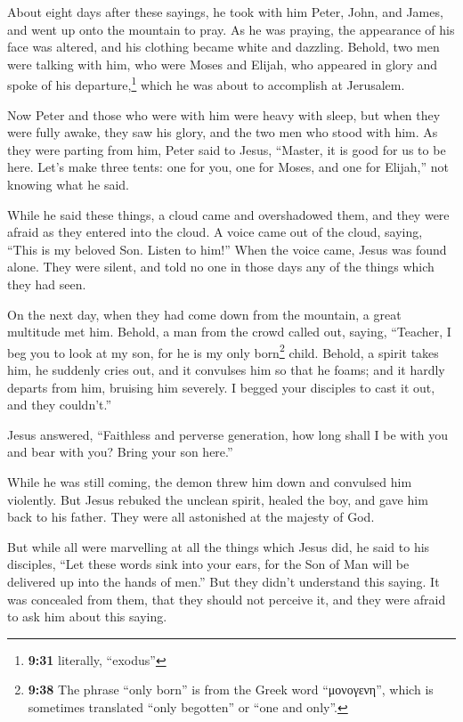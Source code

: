  About eight days after these sayings, he took with him
Peter, John, and James, and went up onto the mountain to pray.
 As he was praying, the appearance of his face was
altered, and his clothing became white and dazzling. 
Behold, two men were talking with him, who were Moses and Elijah,
 who appeared in glory and spoke of his
departure,\footnote{\textbf{9:31} literally, ``exodus''} which he was
about to accomplish at Jerusalem.

 Now Peter and those who were with him were heavy with
sleep, but when they were fully awake, they saw his glory, and the two
men who stood with him.  As they were parting from him,
Peter said to Jesus, ``Master, it is good for us to be here. Let's make
three tents: one for you, one for Moses, and one for Elijah,'' not
knowing what he said.

 While he said these things, a cloud came and
overshadowed them, and they were afraid as they entered into the cloud.
 A voice came out of the cloud, saying, ``This is my
beloved Son. Listen to him!''  When the voice came, Jesus
was found alone. They were silent, and told no one in those days any of
the things which they had seen.

 On the next day, when they had come down from the
mountain, a great multitude met him.  Behold, a man from
the crowd called out, saying, ``Teacher, I beg you to look at my son,
for he is my only born\footnote{\textbf{9:38} The phrase ``only born''
  is from the Greek word ``μονογενη'', which is sometimes translated
  ``only begotten'' or ``one and only''.} child.  Behold,
a spirit takes him, he suddenly cries out, and it convulses him so that
he foams; and it hardly departs from him, bruising him severely.
 I begged your disciples to cast it out, and they
couldn't.''

 Jesus answered, ``Faithless and perverse generation, how
long shall I be with you and bear with you? Bring your son here.''

 While he was still coming, the demon threw him down and
convulsed him violently. But Jesus rebuked the unclean spirit, healed
the boy, and gave him back to his father.  They were all
astonished at the majesty of God.

But while all were marvelling at all the things which Jesus did, he said
to his disciples,  ``Let these words sink into your ears,
for the Son of Man will be delivered up into the hands of men.''
 But they didn't understand this saying. It was concealed
from them, that they should not perceive it, and they were afraid to ask
him about this saying.

